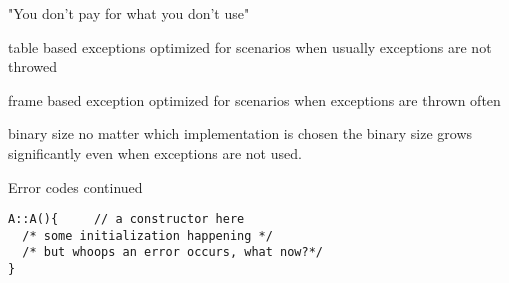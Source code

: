 \documentclass[10pt,a4paper]{beamer}
\begin{document}
\begin{frame}{"You don't pay for what you don't use"}
	\begin{block}{table based exceptions}
		optimized for scenarios when usually exceptions are not throwed
	\end{block}

	\begin{block}{frame based exception}
		optimized for scenarios when exceptions are thrown often
	\end{block}

	\begin{block}{binary size}
		no matter which implementation is chosen the binary size grows
		significantly even when exceptions are not used.
	\end{block}

\end{frame}


\begin{frame}[fragile]{Error codes continued}
	\begin{verbatim}
A::A(){ 	// a constructor here
  /* some initialization happening */
  /* but whoops an error occurs, what now?*/
}
	\end{verbatim}
\end{frame}
\end{document}
